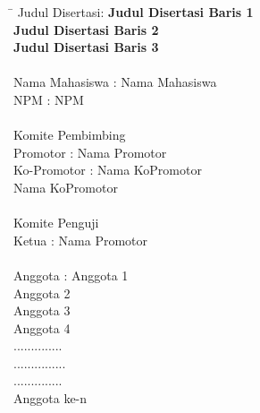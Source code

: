 \newpage
\begin{tabbing}
 \hspace{4cm}\=\kill
  Judul Disertasi\>: \textbf{Judul Disertasi Baris 1} \\
\> ${}$\hspace{0.60em}\textbf{Judul Disertasi Baris 2} \\
\> ${}$\hspace{0.60em}\textbf{Judul Disertasi Baris 3} \\
\> \\

Nama Mahasiswa \>:  Nama Mahasiswa \\
NPM  \>:  NPM\\
\> \\

Komite Pembimbing\\
Promotor \>: Nama Promotor\\
Ko-Promotor \>: Nama KoPromotor\\
\> ${}$\hspace{0.35em}Nama KoPromotor\\
\> \\
Komite Penguji\\
Ketua \>: Nama Promotor\\
\> \\

Anggota \>: Anggota 1 \\
\> ${}$\hspace{0.6em}Anggota 2\\
\> ${}$\hspace{0.6em}Anggota 3\\
\> ${}$\hspace{0.6em}Anggota 4\\
\> ${}$\hspace{0.6em}..............\\
\> ${}$\hspace{0.6em}...............\\
\> ${}$\hspace{0.6em}..............\\
\> ${}$\hspace{0.6em}Anggota ke-n\\






\end{tabbing}
